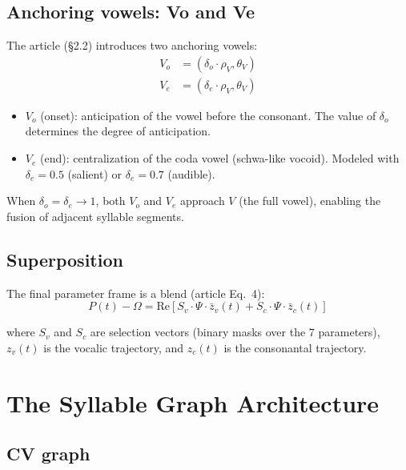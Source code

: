 \documentclass[11pt,a4paper]{article}
\begin{document}
\subsection{Anchoring vowels: Vo and Ve}

The article (\S2.2) introduces two anchoring vowels:
\begin{align}
V_o &= (\delta_o \cdot \rho_V, \theta_V) \\
V_e &= (\delta_e \cdot \rho_V, \theta_V)
\end{align}

\begin{itemize}
\item $V_o$ (onset): anticipation of the vowel before the consonant.
  The value of $\delta_o$ determines the degree of anticipation.
\item $V_e$ (end): centralization of the coda vowel (schwa-like
  vocoid). Modeled with $\delta_e = 0.5$ (salient) or $\delta_e = 0.7$
  (audible).
\end{itemize}

When $\delta_o = \delta_e \to 1$, both $V_o$ and $V_e$ approach $V$
(the full vowel), enabling the fusion of adjacent syllable segments.

\subsection{Superposition}

The final parameter frame is a blend (article Eq.~4):
\begin{equation}
\tag{art.\,4}
P(t) - \Omega = \text{Re}\left[ S_v \cdot \Psi \cdot \bar{z}_v(t)
                              + S_c \cdot \Psi \cdot \bar{z}_c(t) \right]
\end{equation}

where $S_v$ and $S_c$ are selection vectors (binary masks over the
7 parameters), $z_v(t)$ is the vocalic trajectory, and $z_c(t)$ is
the consonantal trajectory.

\section{The Syllable Graph Architecture}

\subsection{CV graph}
\end{document}
